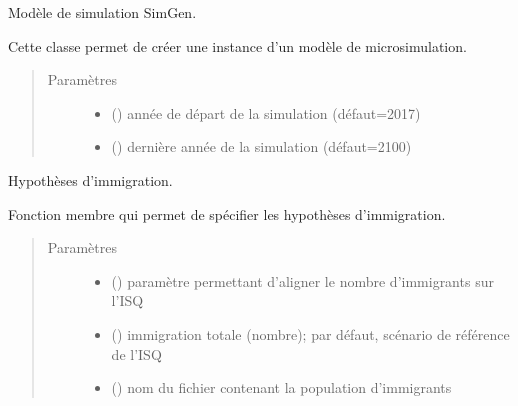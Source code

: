 \documentclass[letterpaper,10pt,french]{sphinxmanual}
\begin{document}
\begin{fulllineitems}
Modèle de simulation SimGen.

Cette classe permet de créer une instance d’un modèle de microsimulation.
\begin{quote}\begin{description}
\item[{Paramètres}] \leavevmode\begin{itemize}
\item {} 
 () \textendash{} année de départ de la simulation (défaut=2017)

\item {} 
 () \textendash{} dernière année de la simulation (défaut=2100)

\end{itemize}

\end{description}\end{quote}

\begin{fulllineitems}
\label{\detokenize{utilisation:simgen.model.immig_assumptions}}
Hypothèses d’immigration.

Fonction membre qui permet de spécifier les hypothèses d’immigration.
\begin{quote}\begin{description}
\item[{Paramètres}] \leavevmode\begin{itemize}
\item {} 
 () \textendash{} paramètre permettant d’aligner le nombre d’immigrants sur l’ISQ

\item {} 
 () \textendash{} immigration totale (nombre); par défaut, scénario de référence de l’ISQ

\item {} 
 () \textendash{} nom du fichier contenant la population d’immigrants

\end{itemize}

\end{description}\end{quote}

\end{fulllineitems}


\end{fulllineitems}
\end{document}
